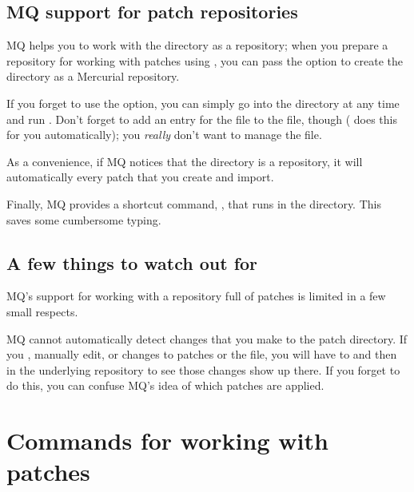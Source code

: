 \subsection{MQ support for patch repositories}

MQ helps you to work with the  directory as a
repository; when you prepare a repository for working with patches
using , you can pass the  option to
create the  directory as a Mercurial repository.

\begin{note}
  If you forget to use the  option, you can simply go
  into the  directory at any time and run
  .  Don't forget to add an entry for the
   file to the  file, though
  ( does this for you
  automatically); you \emph{really} don't want to manage the
   file.
\end{note}

As a convenience, if MQ notices that the 
directory is a repository, it will automatically  every
patch that you create and import.

Finally, MQ provides a shortcut command, , that runs
 in the  directory.  This saves
some cumbersome typing.

\subsection{A few things to watch out for}

MQ's support for working with a repository full of patches is limited
in a few small respects.

MQ cannot automatically detect changes that you make to the patch
directory.  If you , manually edit, or 
changes to patches or the  file, you will have to
 and then
 in the underlying repository to
see those changes show up there.  If you forget to do this, you can
confuse MQ's idea of which patches are applied.

\section{Commands for working with patches}
\label{sec:mq:tools}

